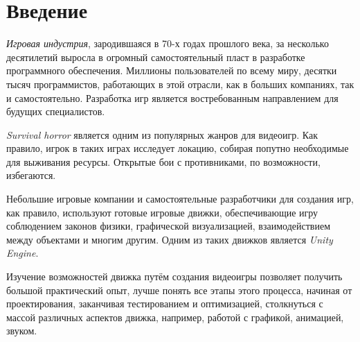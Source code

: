 
\section*{Введение}
\thispagestyle{withCompileDate}

\textit{Игровая индустрия}, зародившаяся в 70-х годах прошлого века, за несколько десятилетий выросла в огромный самостоятельный пласт в разработке программного обеспечения. Миллионы пользователей по всему миру, десятки тысяч программистов, работающих в этой отрасли, как в больших компаниях, так и самостоятельно. Разработка игр является востребованным направлением для будущих специалистов.

\textit{Survival horror} является одним из популярных жанров для видеоигр. Как правило, игрок в таких играх исследует локацию, собирая попутно необходимые для выживания ресурсы. Открытые бои с противниками, по возможности, избегаются.

Небольшие игровые компании и самостоятельные разработчики для создания игр, как правило, используют готовые игровые движки, обеспечивающие игру соблюдением законов физики, графической визуализацией, взаимодействием между объектами и многим другим. Одним из таких движков является \textit{Unity Engine}.

Изучение возможностей движка путём создания видеоигры позволяет получить большой практический опыт, лучше понять все этапы этого процесса, начиная от проектирования, заканчивая тестированием и оптимизацией, столкнуться с массой различных аспектов движка, например, работой с графикой, анимацией, звуком. 
